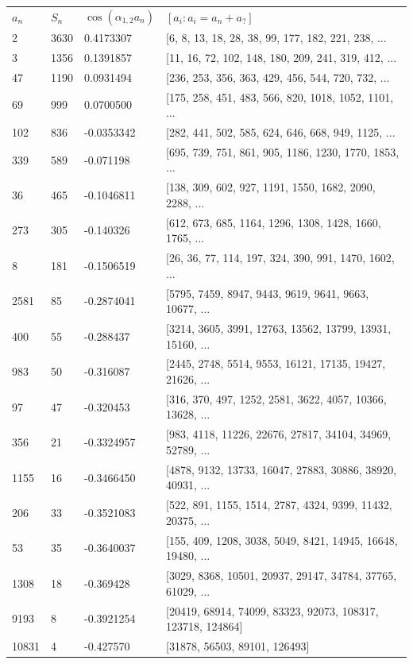 \documentclass{article}
\theoremstyle{definition}
\theoremstyle{remark}
\numberwithin{equation}{section}
\begin{document}
\begin{tabular}{llll}
$a_n$ & $S_n$ & $\cos(\alpha_{1,2}  a_n)$ & $[a_i : a_i = a_n + a_?]$\\

2 & 3630 & 0.4173307 & [6, 8, 13, 18, 28, 38, 99, 177, 182, 221, 238, ...\\
3 & 1356 & 0.1391857 & [11, 16, 72, 102, 148, 180, 209, 241, 319, 412, ...\\
47 & 1190 & 0.0931494 & [236, 253, 356, 363, 429, 456, 544, 720, 732, ...\\
69 & 999 & 0.0700500 & [175, 258, 451, 483, 566, 820, 1018, 1052, 1101, ...\\
102 & 836 & -0.0353342 & [282, 441, 502, 585, 624, 646, 668, 949, 1125, ...\\
339 & 589 & -0.071198 & [695, 739, 751, 861, 905, 1186, 1230, 1770, 1853, ...\\
36 & 465 & -0.1046811 & [138, 309, 602, 927, 1191, 1550, 1682, 2090, 2288, ...\\
273 & 305 & -0.140326 & [612, 673, 685, 1164, 1296, 1308, 1428, 1660, 1765, ...\\
8 & 181 & -0.1506519 & [26, 36, 77, 114, 197, 324, 390, 991, 1470, 1602, ...\\
2581 & 85 & -0.2874041 & [5795, 7459, 8947, 9443, 9619, 9641, 9663, 10677, ...\\
400 & 55 & -0.288437 & [3214, 3605, 3991, 12763, 13562, 13799, 13931, 15160, ...\\
983 & 50 & -0.316087 & [2445, 2748, 5514, 9553, 16121, 17135, 19427, 21626, ...\\
97 & 47 & -0.320453 & [316, 370, 497, 1252, 2581, 3622, 4057, 10366, 13628, ...\\
356 & 21 & -0.3324957 & [983, 4118, 11226, 22676, 27817, 34104, 34969, 52789, ...\\
1155 & 16 & -0.3466450 & [4878, 9132, 13733, 16047, 27883, 30886, 38920, 40931, ...\\
206 & 33 & -0.3521083 & [522, 891, 1155, 1514, 2787, 4324, 9399, 11432, 20375, ...\\
53 & 35 & -0.3640037 & [155, 409, 1208, 3038, 5049, 8421, 14945, 16648, 19480, ...\\
1308 & 18 & -0.369428 & [3029, 8368, 10501, 20937, 29147, 34784, 37765, 61029, ...\\
9193 & 8 & -0.3921254 & [20419, 68914, 74099, 83323, 92073, 108317, 123718, 124864]\\
10831 & 4 & -0.427570 & [31878, 56503, 89101, 126493]\\

\end{tabular}
\end{document}
